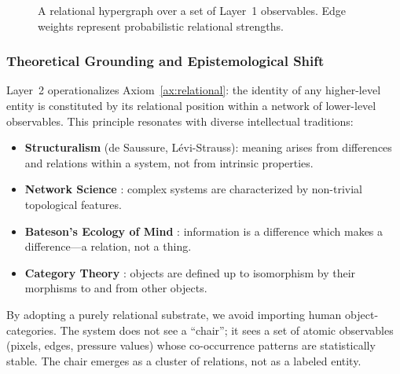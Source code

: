 \begin{figure}[htbp]
    \centering
    \caption{A relational hypergraph over a set of Layer~1 observables. Edge weights represent probabilistic relational strengths.}
    \label{fig:layer2}
\end{figure}

\subsubsection{Theoretical Grounding and Epistemological Shift}
Layer~2 operationalizes Axiom~\ref{ax:relational}: the identity of any higher-level entity is constituted by its relational position within a network of lower-level observables. This principle resonates with diverse intellectual traditions:
\begin{itemize}
    \item \textbf{Structuralism} (de Saussure, Lévi-Strauss): meaning arises from differences and relations within a system, not from intrinsic properties.
    \item \textbf{Network Science} \cite{barabasi2002}: complex systems are characterized by non-trivial topological features.
    \item \textbf{Bateson's Ecology of Mind} \cite{bateson1972}: information is a difference which makes a difference—a relation, not a thing.
    \item \textbf{Category Theory} \cite{maclane1971}: objects are defined up to isomorphism by their morphisms to and from other objects.
\end{itemize}
By adopting a purely relational substrate, we avoid importing human object-categories. The system does not see a ``chair''; it sees a set of atomic observables (pixels, edges, pressure values) whose co-occurrence patterns are statistically stable. The chair emerges as a cluster of relations, not as a labeled entity.

